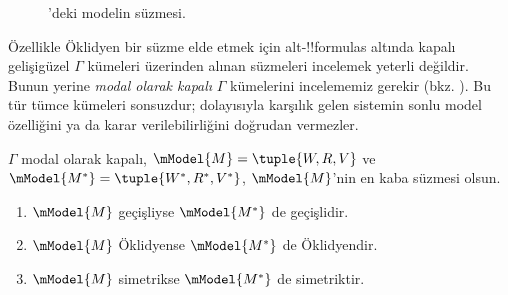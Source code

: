 \documentclass[../../../include/open-logic-section]{subfiles}
\begin{document}
\begin{figure}[ht]
  \centering
  \caption{'deki modelin süzmesi.}
\end{figure}

Özellikle Öklidyen bir süzme elde etmek için alt-!!{formula}s altında kapalı
gelişigüzel $\Gamma$ kümeleri üzerinden alınan süzmeleri incelemek yeterli
değildir. Bunun yerine \emph{modal olarak kapalı} $\Gamma$ kümelerini
incelememiz gerekir (bkz. ). Bu tür tümce
kümeleri sonsuzdur; dolayısıyla karşılık gelen sistemin sonlu model
özelliğini ya da karar verilebilirliğini doğrudan vermezler.

\begin{thm}
  $\Gamma$ modal olarak kapalı,
  $\mModel{M}=\tuple{W,R,V}$ ve
  $\mModel{M^*}=\tuple{W^*,R^*,V^*}$, $\mModel{M}$'nin en kaba süzmesi
  olsun.
  \begin{enumerate}
  \item $\mModel{M}$ geçişliyse $\mModel{M^*}$ de geçişlidir.
  \item $\mModel{M}$ Öklidyense $\mModel{M^*}$ de Öklidyendir.
  \item $\mModel{M}$ simetrikse $\mModel{M^*}$ de simetriktir.
  \end{enumerate}
\end{thm}
\end{document}
